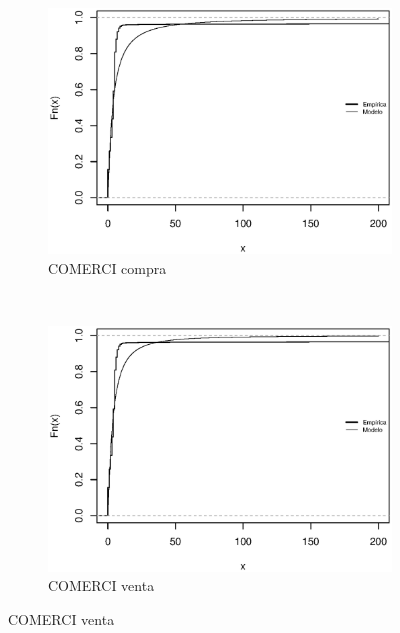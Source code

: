 \documentclass[11pt]{article}
\numberwithin{equation}{section} %
\begin{document}
\begin{figure}[htbp]
\begin{subfigure}[b]{0.5\textwidth}
\centering
\includegraphics[width=\textwidth, trim=0 0.5cm 0 1cm]{comercicanccompra.eps}
\caption{COMERCI compra}
\label{fig:comercicanccompra}
\end{subfigure}%
~ %
\begin{subfigure}[b]{0.5\textwidth}
\centering
\includegraphics[width=\textwidth, trim=0 0.5cm 0 1cm]{comercicancventa.eps}
\caption{COMERCI venta}
\label{fig:comercicancventa}
\end{subfigure}


\end{figure}
\end{document}
